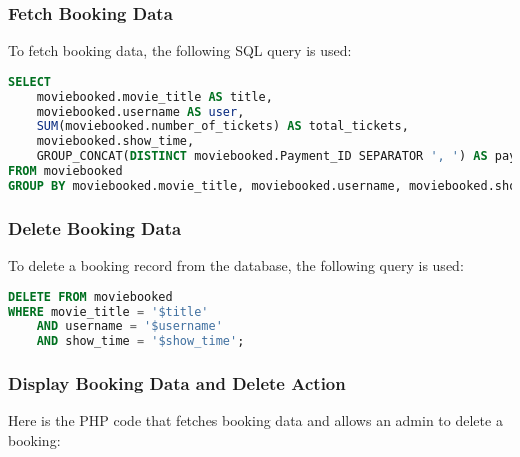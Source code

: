 \documentclass[a4paper,12pt]{article}  %
\begin{document}
\subsubsection{Fetch Booking Data}
To fetch booking data, the following SQL query is used:

\begin{lstlisting}[language=SQL, caption={Fetch Booking Data}, label={lst:fetch_booking_data}]
SELECT 
    moviebooked.movie_title AS title, 
    moviebooked.username AS user, 
    SUM(moviebooked.number_of_tickets) AS total_tickets, 
    moviebooked.show_time, 
    GROUP_CONCAT(DISTINCT moviebooked.Payment_ID SEPARATOR ', ') AS payment_ids
FROM moviebooked 
GROUP BY moviebooked.movie_title, moviebooked.username, moviebooked.show_time;
\end{lstlisting}

\subsubsection{Delete Booking Data}
To delete a booking record from the database, the following query is used:

\begin{lstlisting}[language=SQL, caption={Delete Booking Data}, label={lst:delete_booking_data}]
DELETE FROM moviebooked 
WHERE movie_title = '$title' 
    AND username = '$username' 
    AND show_time = '$show_time';
\end{lstlisting}

\subsubsection{Display Booking Data and Delete Action}
Here is the PHP code that fetches booking data and allows an admin to delete a booking:
\end{document}
